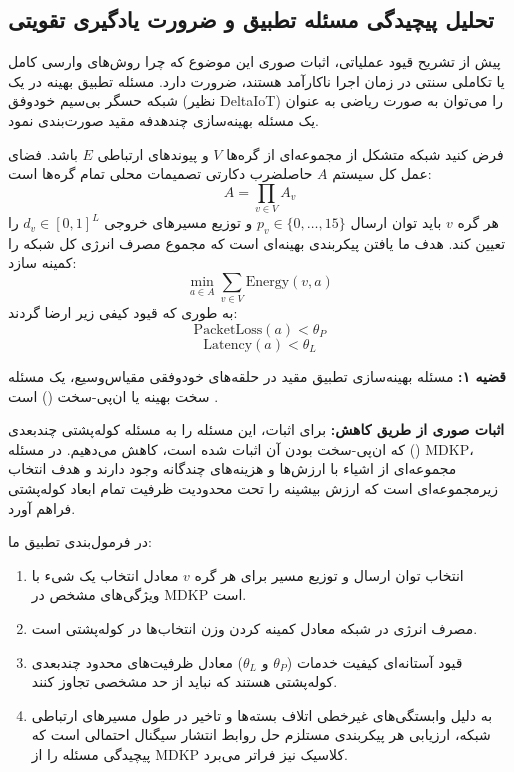 \documentclass[oneside,openany,phd]{TMU-Thesis}
\begin{document}
\subsection{تحلیل پیچیدگی مسئله تطبیق و ضرورت یادگیری تقویتی}
\label{subsec:np_hard_proof}

پیش از تشریح قیود عملیاتی، اثبات صوری این موضوع که چرا روش‌های وارسی کامل یا تکاملی سنتی در زمان اجرا ناکارآمد هستند، ضرورت دارد. مسئله تطبیق بهینه در یک شبکه حسگر بی‌سیم خودوفق (نظیر DeltaIoT) را می‌توان به صورت ریاضی به عنوان یک مسئله بهینه‌سازی چندهدفه مقید صورت‌بندی نمود.

فرض کنید شبکه متشکل از مجموعه‌ای از گره‌ها $V$ و پیوندهای ارتباطی $E$ باشد. فضای عمل کل سیستم $A$ حاصلضرب دکارتی تصمیمات محلی تمام گره‌ها است:
$$A = \prod_{v \in V} A_v$$
هر گره $v$ باید توان ارسال $p_v \in \{0, \ldots, 15\}$ و توزیع مسیرهای خروجی $d_v \in [0, 1]^L$ را تعیین کند. هدف ما یافتن پیکربندی بهینه‌ای است که مجموع مصرف انرژی کل شبکه را کمینه سازد:
$$\min_{a \in A} \sum_{v \in V} \text{Energy}(v, a)$$
به طوری که قیود کیفی زیر ارضا گردند:
$$\text{PacketLoss}(a) < \theta_P$$
$$\text{Latency}(a) < \theta_L$$

\textbf{قضیه ۱:} مسئله بهینه‌سازی تطبیق مقید در حلقه‌های خودوفقی مقیاس‌وسیع، یک مسئله سخت بهینه یا ان‌پی-سخت () است \cite{garey1979computers}.

\textbf{اثبات صوری از طریق کاهش:}
برای اثبات، این مسئله را به مسئله کوله‌پشتی چندبعدی () \cite{garey1979computers} که ان‌پی-سخت بودن آن اثبات شده است، کاهش می‌دهیم. 
در مسئله MDKP، مجموعه‌ای از اشیاء با ارزش‌ها و هزینه‌های چندگانه وجود دارند و هدف انتخاب زیرمجموعه‌ای است که ارزش بیشینه را تحت محدودیت ظرفیت تمام ابعاد کوله‌پشتی فراهم آورد. 

در فرمول‌بندی تطبیق ما:
\begin{enumerate}
    \item انتخاب توان ارسال و توزیع مسیر برای هر گره $v$ معادل انتخاب یک شیء با ویژگی‌های مشخص در MDKP است.
    \item مصرف انرژی در شبکه معادل کمینه کردن وزن انتخاب‌ها در کوله‌پشتی است.
    \item قیود آستانه‌ای کیفیت خدمات ($\theta_P$ و $\theta_L$) معادل ظرفیت‌های محدود چندبعدی کوله‌پشتی هستند که نباید از حد مشخصی تجاوز کنند.
    \item به دلیل وابستگی‌های غیرخطی اتلاف بسته‌ها و تاخیر در طول مسیرهای ارتباطی شبکه، ارزیابی هر پیکربندی مستلزم حل روابط انتشار سیگنال احتمالی است که پیچیدگی مسئله را از MDKP کلاسیک نیز فراتر می‌برد.
\end{enumerate}
\end{document}
